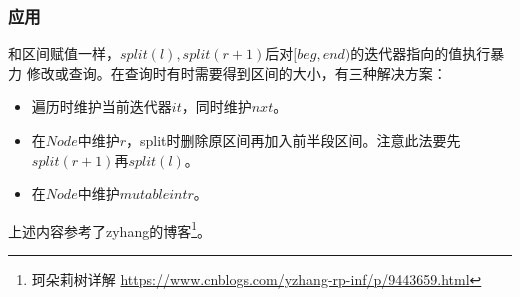 \subsubsection{应用}
和区间赋值一样，$split(l),split(r+1)$后对$[beg,end)$的迭代器指向的值执行暴力
修改或查询。在查询时有时需要得到区间的大小，有三种解决方案：
\begin{itemize}
    \item 遍历时维护当前迭代器$it$，同时维护$nxt$。
    \item 在$Node$中维护$r$，split时删除原区间再加入前半段区间。注意此法要先
    $split(r+1)$再$split(l)$。
    \item 在$Node$中维护$mutable int r$。
\end{itemize}

上述内容参考了zyhang的博客\footnote{
    珂朵莉树详解
    \url{https://www.cnblogs.com/yzhang-rp-inf/p/9443659.html}
}。
